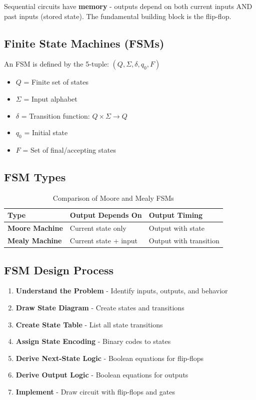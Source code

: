 \documentclass[12pt,a4paper]{article}
\begin{document}
\begin{conceptbox}
Sequential circuits have \textbf{memory} - outputs depend on both current inputs AND past inputs (stored state). The fundamental building block is the flip-flop.
\end{conceptbox}

\subsection{Finite State Machines (FSMs)}

An FSM is defined by the 5-tuple: $(Q, \Sigma, \delta, q_0, F)$

\begin{itemize}
  \item $Q$ = Finite set of states
  \item $\Sigma$ = Input alphabet
  \item $\delta$ = Transition function: $Q \times \Sigma \rightarrow Q$
  \item $q_0$ = Initial state
  \item $F$ = Set of final/accepting states
\end{itemize}

\subsection{FSM Types}

\begin{table}[H]
\centering
\begin{tabular}{lll}
\toprule
\textbf{Type} & \textbf{Output Depends On} & \textbf{Output Timing} \\
\midrule
\textbf{Moore Machine} & Current state only & Output with state \\
\textbf{Mealy Machine} & Current state + input & Output with transition \\
\bottomrule
\end{tabular}
\caption{Comparison of Moore and Mealy FSMs}
\end{table}

\subsection{FSM Design Process}

\begin{enumerate}[label=\textbf{Step \arabic*:}]
  \item \textbf{Understand the Problem} - Identify inputs, outputs, and behavior
  \item \textbf{Draw State Diagram} - Create states and transitions
  \item \textbf{Create State Table} - List all state transitions
  \item \textbf{Assign State Encoding} - Binary codes to states
  \item \textbf{Derive Next-State Logic} - Boolean equations for flip-flops
  \item \textbf{Derive Output Logic} - Boolean equations for outputs
  \item \textbf{Implement} - Draw circuit with flip-flops and gates
\end{enumerate}
\end{document}
